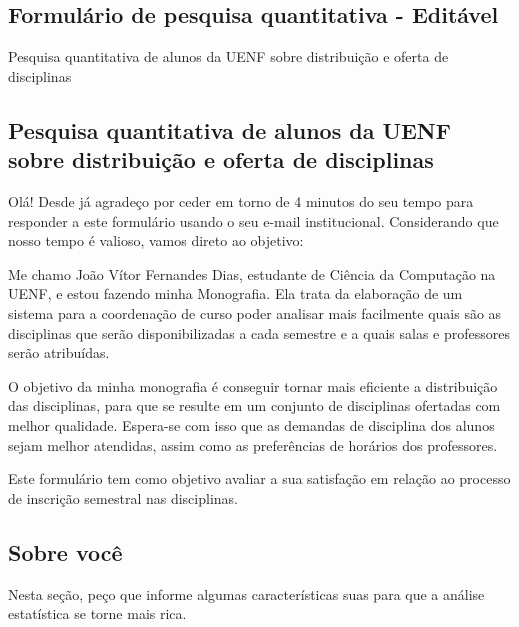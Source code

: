 \begin{apendicesenv}
  \chapter{Formulário de pesquisa quantitativa - Editável} \label{apendice:FormularioPesquisaQuantitativaEditavel}

  \begin{Form}[action=mailto:joaovitorfd2000@gmai.com, encoding=html, method=post]

    Pesquisa quantitativa de alunos da UENF sobre distribuição e oferta de disciplinas

    \section*{Pesquisa quantitativa de alunos da UENF sobre distribuição e oferta de disciplinas}

    Olá! Desde já agradeço por ceder em torno de 4 minutos do seu tempo para responder a este formulário usando o seu e-mail institucional. Considerando que nosso tempo é valioso, vamos direto ao objetivo:

    Me chamo João Vítor Fernandes Dias, estudante de Ciência da Computação na UENF, e estou fazendo minha Monografia. Ela trata da elaboração de um sistema para a coordenação de curso poder analisar mais facilmente quais são as disciplinas que serão disponibilizadas a cada semestre e a quais salas e professores serão atribuídas.

    O objetivo da minha monografia é conseguir tornar mais eficiente a distribuição das disciplinas, para que se resulte em um conjunto de disciplinas ofertadas com melhor qualidade. Espera-se com isso que as demandas de disciplina dos alunos sejam melhor atendidas, assim como as preferências de horários dos professores.

    Este formulário tem como objetivo avaliar a sua satisfação em relação ao processo de inscrição semestral nas disciplinas.

    \section*{Sobre você}

    Nesta seção, peço que informe algumas características suas para que a análise estatística se torne mais rica.


\end{Form}
\end{apendicesenv}
